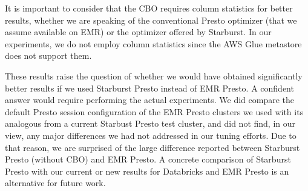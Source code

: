 It is important to consider that the CBO requires column statistics for better results, whether we are speaking of the conventional Presto optimizer (that we assume available on EMR) or the optimizer offered by Starburst. In our experiments, we do not employ column statistics since the AWS Glue metastore does not support them.

These results raise the question of whether we would have obtained significantly better results if we used Starburst Presto instead of EMR Presto. A confident answer would require performing the actual experiments. We did compare the default Presto session configuration of the EMR Presto clusters we used with its analogous from a current Starbust Presto test cluster, and did not find, in our view, any major differences we had not addressed in our tuning efforts. Due to that reason, we are surprised of the large difference reported between Starburst Presto (without CBO) and EMR Presto. A concrete comparison of Starburst Presto with our current or new results for Databricks and EMR Presto is an alternative for future work.











